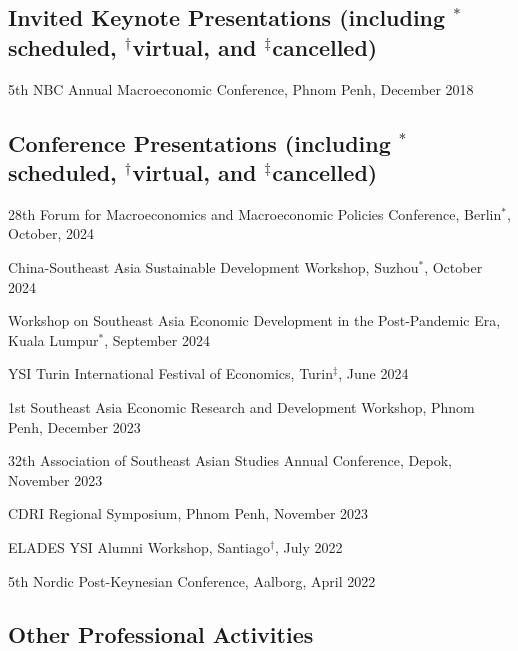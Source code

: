\documentclass[10pt,a4paper]{article}
\begin{document}
	
\subsection*{Invited Keynote Presentations (including $^\ast$scheduled, $^\dag$virtual, and $^\ddag$cancelled)}

5th NBC Annual Macroeconomic Conference, Phnom Penh, December 2018


\subsection*{Conference Presentations (including $^\ast$scheduled, $^\dag$virtual, and $^\ddag$cancelled)}

28th Forum for Macroeconomics and Macroeconomic Policies Conference, Berlin$^\ast$, October, 2024

China-Southeast Asia Sustainable Development Workshop, Suzhou$^\ast$, October 2024

Workshop on Southeast Asia Economic Development in the Post-Pandemic Era, Kuala Lumpur$^\ast$, September 2024

YSI Turin International Festival of Economics, Turin$^\ddag$, June 2024

1st Southeast Asia Economic Research and Development Workshop, Phnom Penh, December 2023

32th Association of Southeast Asian Studies Annual Conference, Depok, November 2023

CDRI Regional Symposium, Phnom Penh, November 2023

ELADES YSI Alumni Workshop, Santiago$^\dag$, July 2022

5th Nordic Post-Keynesian Conference, Aalborg, April 2022

\subsection*{Other Professional Activities}
\end{document}

